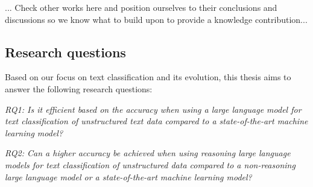 
... Check other works here and position ourselves to their conclusions and discussions so we know what to build upon to provide a knowledge contribution...

\subsection{Research questions}

Based on our focus on text classification and its evolution, this thesis aims to answer the following research questions:

\bigskip
\textit{RQ1: Is it efficient based on the accuracy when using a large language model for text classification of unstructured text data compared to a state-of-the-art machine learning model?}

\bigskip
\textit{RQ2: Can a higher accuracy be achieved when using reasoning large language models for text classification of unstructured data compared to a non-reasoning large language model or a state-of-the-art machine learning model?}